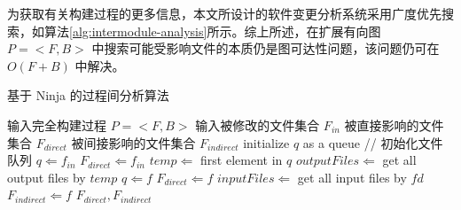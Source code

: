 为获取有关构建过程的更多信息，本文所设计的软件变更分析系统采用广度优先搜索，如算法\ref{alg:intermodule-analysis}所示。综上所述，在扩展有向图 $P = <F, B>$ 中搜索可能受影响文件的本质仍是图可达性问题，该问题仍可在 $O(F + B)$ 中解决。\cite{GRAPHREACHABILITY}

\vskip 13.8pt
\renewcommand{\thealgorithm}{4}
    \begin{algorithm}
        \caption{基于 Ninja 的过程间分析算法}
        \begin{algorithmic}[1]
            \Require 输入完全构建过程 $P = <F, B>$
            \Require 输入被修改的文件集合 $F_{in}$
            \Ensure 被直接影响的文件集合 $F_{direct}$
            \Ensure 被间接影响的文件集合 $F_{indirect}$
            \State initialize $q$ as a queue // 初始化文件队列
                \State $q \Leftarrow f_{in}$
                \State $F_{direct} \Leftarrow f_{in}$
            \EndFor
                \State $temp \Leftarrow$ first element in $q$
                \State $outputFiles \Leftarrow$ get all output files by $temp$
                        \State $q \Leftarrow f$
                        \State $F_{direct} \Leftarrow f$
                    \EndIf
                \EndFor
            \EndWhile
                \State $inputFiles \Leftarrow$ get all input files by $fd$
                        \State $F_{indirect} \Leftarrow f$
                    \EndIf
                \EndFor
            \EndFor
            \State \Return $F_{direct}, F_{indirect}$
        \end{algorithmic}
        \label{alg:intermodule-analysis}
    \end{algorithm}
    \vskip 13.8pt
